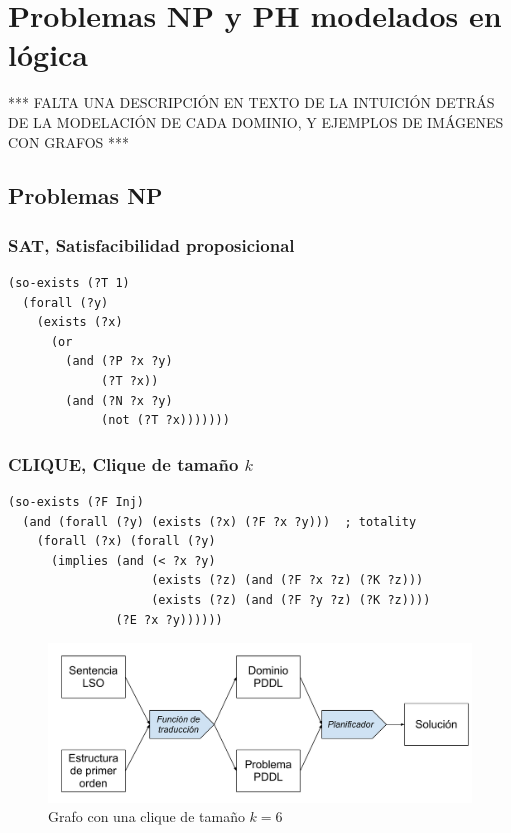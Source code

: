 
\chapter{Problemas NP y PH modelados en lógica}
\label{apendiceA}

*** FALTA UNA DESCRIPCIÓN EN TEXTO DE LA INTUICIÓN DETRÁS DE LA MODELACIÓN DE
CADA DOMINIO, Y EJEMPLOS DE IMÁGENES CON GRAFOS ***

\section{Problemas NP}

\subsection{SAT, Satisfacibilidad proposicional}
\begin{verbatim}
(so-exists (?T 1)
  (forall (?y)
    (exists (?x)
      (or
        (and (?P ?x ?y)
             (?T ?x)) 
        (and (?N ?x ?y)
             (not (?T ?x)))))))
\end{verbatim}

\subsection{CLIQUE, Clique de tamaño $k$}
\begin{verbatim}
(so-exists (?F Inj)
  (and (forall (?y) (exists (?x) (?F ?x ?y)))  ; totality
    (forall (?x) (forall (?y)
      (implies (and (< ?x ?y)
                    (exists (?z) (and (?F ?x ?z) (?K ?z)))
                    (exists (?z) (and (?F ?y ?z) (?K ?z))))
               (?E ?x ?y))))))
\end{verbatim}
\begin{figure}[h!]
\centering
\includegraphics[width=\textwidth]{figuras/esquema_herramienta.pdf}
\caption[Grafo con una \textit{clique} de tamaño $k = 6$]{Grafo con una clique de tamaño
$k = 6$}
\label{clique}
\end{figure}


